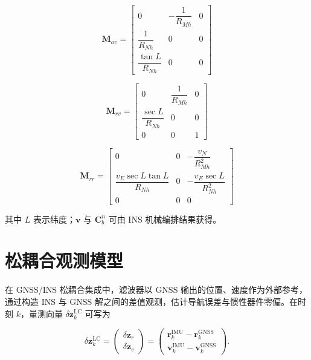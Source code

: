 \begin{equation}
    \bm{M}_{av} =
    \begin{bmatrix}
        0                      & -\dfrac{1}{R_{Mh}} & 0 \\[4pt]
        \dfrac{1}{R_{Nh}}      & 0                  & 0 \\[4pt]
        \dfrac{\tan L}{R_{Nh}} & 0                  & 0
    \end{bmatrix}
\end{equation}

\begin{equation}
    \bm{M}_{rv} =
    \begin{bmatrix}
        0                      & \dfrac{1}{R_{Mh}} & 0 \\[4pt]
        \dfrac{\sec L}{R_{Nh}} & 0                 & 0 \\[4pt]
        0                      & 0                 & 1
    \end{bmatrix}
\end{equation}

\begin{equation}
    \bm{M}_{rr} =
    \begin{bmatrix}
        0                               & 0 & -\dfrac{v_N}{R_{Mh}^2}       \\[4pt]
        \dfrac{v_E\sec L\tan L}{R_{Nh}} & 0 & -\dfrac{v_E\sec L}{R_{Nh}^2} \\[4pt]
        0                               & 0 & 0
    \end{bmatrix}
\end{equation}

其中 $L$ 表示纬度；$\bm{v}$ 与 $\bm{C}_{b}^n$ 可由 INS 机械编排结果获得。


\section{松耦合观测模型}

在 GNSS/INS 松耦合集成中，滤波器以 GNSS 输出的位置、速度作为外部参考，通过构造 INS 与 GNSS 解之间的差值观测，估计导航误差与惯性器件零偏。在时刻 $k$，量测向量 $\delta \bm{z}_k^{\text{LC}}$ 可写为

\begin{equation}
    \delta \bm{z}_k^{\text{LC}} =
    \begin{pmatrix}
        \delta \bm{z}_r \\[2pt]
        \delta \bm{z}_v
    \end{pmatrix}
    =
    \begin{pmatrix}
        \bm{r}_k^{\text{IMU}} - \bm{r}_k^{\text{GNSS}} \\[2pt]
        \bm{v}_k^{\text{IMU}} - \bm{v}_k^{\text{GNSS}}
    \end{pmatrix}.
    \label{eq:lc_meas_vector}
\end{equation}

